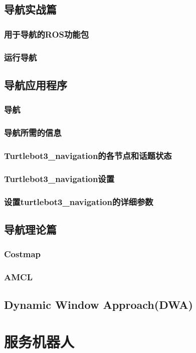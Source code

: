 \documentclass[geye,green,kindle,cn]{elegantnote}
\begin{document}
\subsection{导航实战篇}
\subsubsection{用于导航的ROS功能包}
\subsubsection{运行导航}
\subsection{导航应用程序}
\subsubsection{导航}
\subsubsection{导航所需的信息}
\subsubsection{Turtlebot3\_navigation的各节点和话题状态}
\subsubsection{Turtlebot3\_navigation设置}
\subsubsection{设置turtlebot3\_navigation的详细参数}
\subsection{导航理论篇}
\subsubsection{Costmap}
\subsubsection{AMCL}
\subsection{Dynamic Window Approach(DWA)}
\section{服务机器人}
\end{document}
